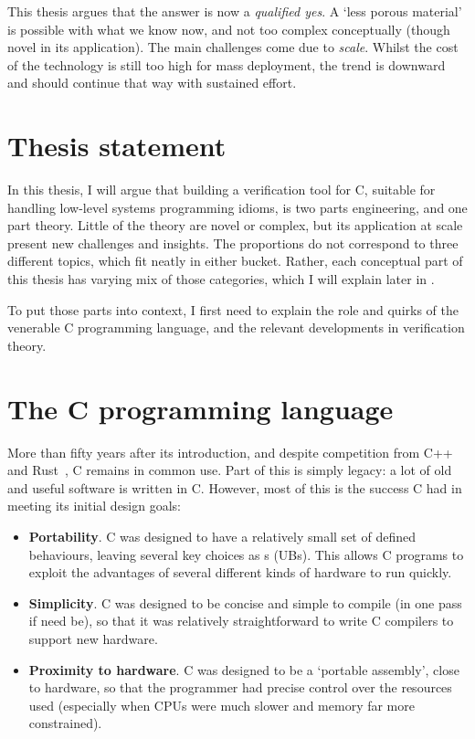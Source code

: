 This thesis argues that the answer is now a \emph{qualified yes}. A `less
porous material' is possible with what we know now, and not too complex
conceptually (though novel in its application). The main challenges come due to
\emph{scale}. Whilst the cost of the technology is still too high for mass
deployment, the trend is downward and should continue that way with sustained
effort.


\section{Thesis statement}

In this thesis, I will argue that building a verification tool for C, suitable
for handling low-level systems programming idioms, is two parts engineering,
and one part theory. Little of the theory are novel or complex, but its
application at scale present new challenges and insights. The proportions do
not correspond to three different topics, which fit neatly in either bucket.
Rather, each conceptual part of this thesis has varying mix of those
categories, which I will explain later in .

To put those parts into context, I first need to explain the role and quirks of
the venerable C programming language, and the relevant developments in
verification theory.

\section{The C programming language}\label{sec:c-lang}

More than fifty years after its introduction, and despite competition from
C++~ and Rust~, C remains in common use. Part
of this is simply legacy: a lot of old and useful software is written in C.
However, most of this is the success C had in meeting its initial design goals:

\begin{itemize}
    \item \textbf{Portability}. C was designed to have a relatively small set
        of defined behaviours, leaving several key choices as
        s (UBs). This allows C programs to
        exploit the advantages of several different kinds of hardware to run
        quickly.
    \item \textbf{Simplicity}. C was designed to be concise and simple to
        compile (in one pass if need be), so that it was relatively
        straightforward to write C compilers to support new hardware.
    \item \textbf{Proximity to hardware}. C was designed to be a `portable
        assembly', close to hardware, so that the programmer had precise
        control over the resources used (especially when CPUs were much slower
        and memory far more constrained).
\end{itemize}

